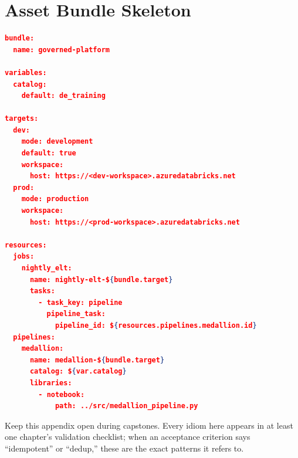 \section{Asset Bundle Skeleton}
%
\begin{lstlisting}[language=json,caption={Minimal databricks.yml with dev/prod targets (Ch. 23).},label={lst:appendixb-bundle}]
bundle:
  name: governed-platform

variables:
  catalog:
    default: de_training

targets:
  dev:
    mode: development
    default: true
    workspace:
      host: https://<dev-workspace>.azuredatabricks.net
  prod:
    mode: production
    workspace:
      host: https://<prod-workspace>.azuredatabricks.net

resources:
  jobs:
    nightly_elt:
      name: nightly-elt-${bundle.target}
      tasks:
        - task_key: pipeline
          pipeline_task:
            pipeline_id: ${resources.pipelines.medallion.id}
  pipelines:
    medallion:
      name: medallion-${bundle.target}
      catalog: ${var.catalog}
      libraries:
        - notebook:
            path: ../src/medallion_pipeline.py
\end{lstlisting}

\begin{tipbox}
Keep this appendix open during capstones. Every idiom here appears in at least one chapter's
validation checklist; when an acceptance criterion says ``idempotent'' or ``dedup,'' these are the
exact patterns it refers to.
\end{tipbox}
